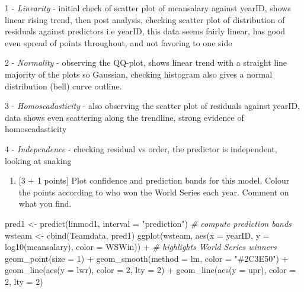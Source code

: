 \documentclass[
]{article}
\newenvironment{Shaded}{\begin{snugshade}}{\end{snugshade}}
\newcommand{\AttributeTok}[1]{\textcolor[rgb]{0.77,0.63,0.00}{#1}}
\newcommand{\CommentTok}[1]{\textcolor[rgb]{0.56,0.35,0.01}{\textit{#1}}}
\newcommand{\DecValTok}[1]{\textcolor[rgb]{0.00,0.00,0.81}{#1}}
\newcommand{\FunctionTok}[1]{\textcolor[rgb]{0.00,0.00,0.00}{#1}}
\newcommand{\NormalTok}[1]{#1}
\newcommand{\OtherTok}[1]{\textcolor[rgb]{0.56,0.35,0.01}{#1}}
\newcommand{\SpecialCharTok}[1]{\textcolor[rgb]{0.00,0.00,0.00}{#1}}
\newcommand{\StringTok}[1]{\textcolor[rgb]{0.31,0.60,0.02}{#1}}
\providecommand{\tightlist}{%
  \setlength{\itemsep}{0pt}\setlength{\parskip}{0pt}}
\begin{document}
1 - \emph{Linearity} - initial check of scatter plot of meansalary
against yearID, shows linear rising trend, then post analysis, checking
scatter plot of distribution of residuals against predictors i.e yearID,
this data seems fairly linear, has good even spread of points
throughout, and not favoring to one side

2 - \emph{Normality} - observing the QQ-plot, shows linear trend with a
straight line majority of the plots so Gaussian, checking histogram also
gives a normal distribution (bell) curve outline.

3 - \emph{Homoscadasticity} - also observing the scatter plot of
residuals against yearID, data shows even scattering along the
trendline, strong evidence of homoscadasticity

4 - \emph{Independence} - checking residual vs order, the predictor is
independent, looking at snaking

\begin{enumerate}
\def\labelenumi{\alph{enumi}.}
\setcounter{enumi}{3}
\tightlist
\item
  {[}3 + 1 points{]} Plot confidence and prediction bands for this
  model. Colour the points according to who won the World Series each
  year. Comment on what you find.
\end{enumerate}

\begin{Shaded}
\begin{Highlighting}[]
\NormalTok{pred1 }\OtherTok{\textless{}{-}} \FunctionTok{predict}\NormalTok{(linmod1, }\AttributeTok{interval =} \StringTok{"prediction"}\NormalTok{) }\CommentTok{\# compute prediction bands}
\NormalTok{wsteam }\OtherTok{\textless{}{-}} \FunctionTok{cbind}\NormalTok{(Teamdata, pred1)}
\FunctionTok{ggplot}\NormalTok{(wsteam, }\FunctionTok{aes}\NormalTok{(}\AttributeTok{x =}\NormalTok{ yearID, }\AttributeTok{y =} \FunctionTok{log10}\NormalTok{(meansalary), }\AttributeTok{color =}\NormalTok{ WSWin)) }\SpecialCharTok{+} \CommentTok{\# highlights World Series winners}
  \FunctionTok{geom\_point}\NormalTok{(}\AttributeTok{size =} \DecValTok{1}\NormalTok{) }\SpecialCharTok{+}
  \FunctionTok{geom\_smooth}\NormalTok{(}\AttributeTok{method =}\NormalTok{ lm, }\AttributeTok{color =} \StringTok{"\#2C3E50"}\NormalTok{) }\SpecialCharTok{+}
  \FunctionTok{geom\_line}\NormalTok{(}\FunctionTok{aes}\NormalTok{(}\AttributeTok{y =}\NormalTok{ lwr), }\AttributeTok{color =} \DecValTok{2}\NormalTok{, }\AttributeTok{lty =} \DecValTok{2}\NormalTok{) }\SpecialCharTok{+}
  \FunctionTok{geom\_line}\NormalTok{(}\FunctionTok{aes}\NormalTok{(}\AttributeTok{y =}\NormalTok{ upr), }\AttributeTok{color =} \DecValTok{2}\NormalTok{, }\AttributeTok{lty =} \DecValTok{2}\NormalTok{)}
\end{Highlighting}
\end{Shaded}
\end{document}

